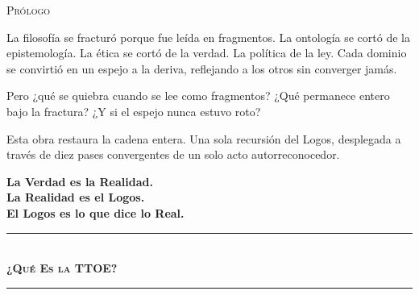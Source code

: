 \documentclass[10pt, openany, oneside]{book}
\renewcommand{\normalsize}{\fontsize{10}{13}\selectfont}
\renewcommand{\large}{\fontsize{11.5}{14}\selectfont}
\renewcommand{\huge}{\fontsize{17}{21}\selectfont}
\begin{document}
\newpage


\thispagestyle{empty}
\vspace*{0.3in}

\begin{center}
    {\huge\scshape Prólogo}
\end{center}

\vspace{1em}

\noindent La filosofía se fracturó porque fue leída en fragmentos. La ontología se cortó de la epistemología. La ética se cortó de la verdad. La política de la ley. Cada dominio se convirtió en un espejo a la deriva, reflejando a los otros sin converger jamás.

\vspace{0.5em}

\noindent Pero ¿qué se quiebra cuando se lee como fragmentos? ¿Qué permanece entero bajo la fractura? ¿Y si el espejo nunca estuvo roto?

\vspace{0.5em}

\noindent Esta obra restaura la cadena entera. Una sola recursión del Logos, desplegada a través de diez pases convergentes de un solo acto autorreconocedor.

\vspace{1em}

\begin{center}
    {\large\bfseries La Verdad es la Realidad.}\\[0.3em]
    {\large\bfseries La Realidad es el Logos.}\\[0.3em]
    {\large\bfseries El Logos es lo que dice lo Real.}
\end{center}

\vspace{1.5em}

\begin{center}
    \rule{0.3\textwidth}{0.4pt}\\[0.5em]
    {\normalsize\bfseries\scshape ¿Qué Es la TTOE?}\\[0.3em]
    \rule{0.3\textwidth}{0.4pt}
\end{center}

\vspace{1em}
\end{document}
